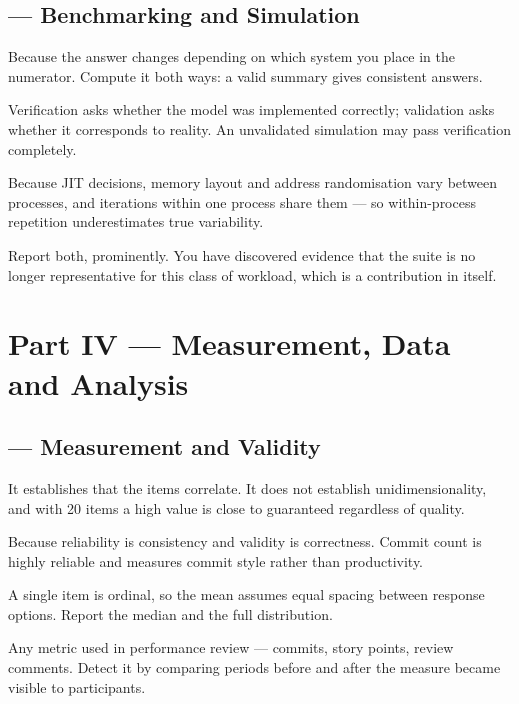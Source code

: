 \subsection*{ --- Benchmarking and Simulation}
\begin{tightnum}
  \item Because the answer changes depending on which system you place in the
    numerator. Compute it both ways: a valid summary gives consistent answers.
  \item Verification asks whether the model was implemented correctly;
    validation asks whether it corresponds to reality. An unvalidated
    simulation may pass verification completely.
  \item Because JIT decisions, memory layout and address randomisation vary
    between processes, and iterations within one process share them --- so
    within-process repetition underestimates true variability.
  \item Report both, prominently. You have discovered evidence that the suite
    is no longer representative for this class of workload, which is a
    contribution in itself.
\end{tightnum}

\section{Part IV --- Measurement, Data and Analysis}

\subsection*{ --- Measurement and Validity}
\begin{tightnum}
  \item It establishes that the items correlate. It does not establish
    unidimensionality, and with 20 items a high value is close to guaranteed
    regardless of quality.
  \item Because reliability is consistency and validity is correctness. Commit
    count is highly reliable and measures commit style rather than productivity.
  \item A single item is ordinal, so the mean assumes equal spacing between
    response options. Report the median and the full distribution.
  \item Any metric used in performance review --- commits, story points, review
    comments. Detect it by comparing periods before and after the measure
    became visible to participants.
\end{tightnum}

